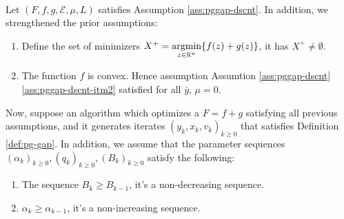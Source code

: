 \documentclass[12pt]{article}
\begin{document}
        \begin{assumption}\;\label{ass:forever-cnvx-cnvg}\\
            Let $(F, f, g, \mathcal E, \mu, L)$ satisfies Assumption \ref{ass:pggap-dscnt}. 
            In addition, we strengthened the prior assumptions:
            \begin{enumerate}[nosep]
                \item Define the set of minimizers $X^+ = \mathop{\rm argmin}\limits_{z\in \mathbb R^n}\{ f(z) + g(z)\}$, it has $X^+ \neq \emptyset$. 
                \item The function $f$ is convex. Hence assumption Assumtion \ref{ass:pggap-dscnt} \ref{ass:pggap-dscnt-itm2} satisfied for all $\bar y$, $\mu = 0$. 
            \end{enumerate}
            Now, suppose an algorithm which optimizes a $F = f + g$ satisfying all previous assumptions, and it generates iterates $(y_k, x_k, v_k)_{k\ge 0}$ that satisfies Definition \ref{def:pg-gap}. 
            In addition, we assume that the parameter sequences $(\alpha_k)_{k \ge 0},(q_k)_{k \ge 0}, (B_k)_{k \ge 0}$ satisfy the following: 
            \begin{enumerate}[nosep]
                \item The sequence $B_k \ge B_{k - 1}$, it's a non-decreasing sequence. 
                \item $\alpha_k \ge \alpha_{k - 1}$, it's a non-increasing sequence. 
            \end{enumerate}
        \end{assumption}
        \begin{assumption}
            
        \end{assumption}
\end{document}
